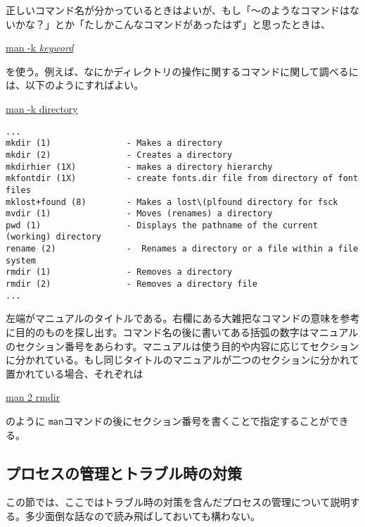 正しいコマンド名が分かっているときはよいが、もし「〜のようなコマンドはないかな？」とか「たしかこんなコマンドがあったはず」と思ったときは、
\begin{commandline2}
\prompt \underline{man -k {\it keyword}}
\end{commandline2} \noindent
を使う。例えば、なにかディレクトリの操作に関するコマンドに関して調べるには、以下のようにすればよい。
\begin{commandline2}
\prompt \underline{man -k directory}
\vspace*{-.8em} 
\begin{verbatim}
...
mkdir (1)               - Makes a directory
mkdir (2)               - Creates a directory
mkdirhier (1X)          - makes a directory hierarchy
mkfontdir (1X)          - create fonts.dir file from directory of font files
mklost+found (8)        - Makes a lost\(plfound directory for fsck
mvdir (1)               - Moves (renames) a directory
pwd (1)                 - Displays the pathname of the current (working) directory
rename (2)              -  Renames a directory or a file within a file system
rmdir (1)               - Removes a directory
rmdir (2)               - Removes a directory file
...
\end{verbatim}
\end{commandline2} \noindent
\noindent 左端がマニュアルのタイトルである。右欄にある大雑把なコマンドの意味を参考に目的のものを探し出す。コマンド名の後に書いてある括弧の数字はマニュアルのセクション番号をあらわす。マニュアルは使う目的や内容に応じてセクションに分かれている。もし同じタイトルのマニュアルが二つのセクションに分かれて置かれている場合、それぞれは
\begin{commandline2}
\prompt \underline{man 2 rmdir}
\end{commandline2} \noindent
のように {\tt man}コマンドの後にセクション番号を書くことで指定することができる。

\subsection{プロセスの管理とトラブル時の対策}
\label{chap: recover}
この節では、ここではトラブル時の対策を含んだプロセスの管理について説明する。多少面倒な話なので読み飛ばしておいても構わない。


